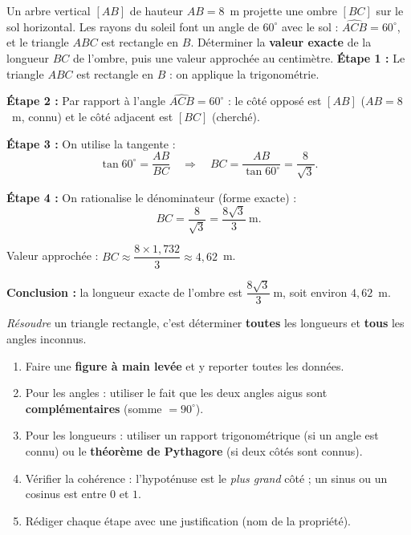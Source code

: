\documentclass[11pt]{article}
\newcommand{\cle}[1]{{\popxbold\color{popdark}#1}}
\begin{document}
\begin{exoresolu}
Un arbre vertical $[AB]$ de hauteur $AB = 8$~m projette une ombre $[BC]$ sur le sol horizontal. Les rayons du soleil font un angle de $60^{\circ}$ avec le sol : $\widehat{ACB} = 60^{\circ}$, et le triangle $ABC$ est rectangle en $B$. Déterminer la \textbf{valeur exacte} de la longueur $BC$ de l'ombre, puis une valeur approchée au centimètre.
\tcblower
\textbf{Étape 1 :} Le triangle $ABC$ est rectangle en $B$ : on applique la trigonométrie.

\textbf{Étape 2 :} Par rapport à l'angle $\widehat{ACB} = 60^{\circ}$ : le côté opposé est $[AB]$ ($AB = 8$~m, connu) et le côté adjacent est $[BC]$ (cherché).

\textbf{Étape 3 :} On utilise la \cle{tangente} :
\[ \tan 60^{\circ} = \dfrac{AB}{BC} \quad \Rightarrow \quad BC = \dfrac{AB}{\tan 60^{\circ}} = \dfrac{8}{\sqrt{3}}. \]

\textbf{Étape 4 :} On rationalise le dénominateur (forme exacte) :
\[ BC = \dfrac{8}{\sqrt{3}} = \dfrac{8\sqrt{3}}{3}~\text{m}. \]

Valeur approchée : $BC \approx \dfrac{8 \times 1{,}732}{3} \approx 4{,}62$~m.

\textbf{Conclusion :} la longueur exacte de l'ombre est $\boxed{\dfrac{8\sqrt{3}}{3}~\text{m}}$, soit environ $4{,}62$~m.
\end{exoresolu}

\begin{methode}
\emph{Résoudre} un triangle rectangle, c'est déterminer \textbf{toutes} les longueurs et \textbf{tous} les angles inconnus.
\begin{enumerate}
\item Faire une \textbf{figure à main levée} et y reporter toutes les données.
\item Pour les angles : utiliser le fait que les deux angles aigus sont \textbf{complémentaires} (somme $= 90^{\circ}$).
\item Pour les longueurs : utiliser un rapport trigonométrique (si un angle est connu) ou le \textbf{théorème de Pythagore} (si deux côtés sont connus).
\item Vérifier la cohérence : l'hypoténuse est le \emph{plus grand} côté ; un sinus ou un cosinus est entre $0$ et $1$.
\item Rédiger chaque étape avec une justification (nom de la propriété).
\end{enumerate}
\end{methode}
\end{document}
